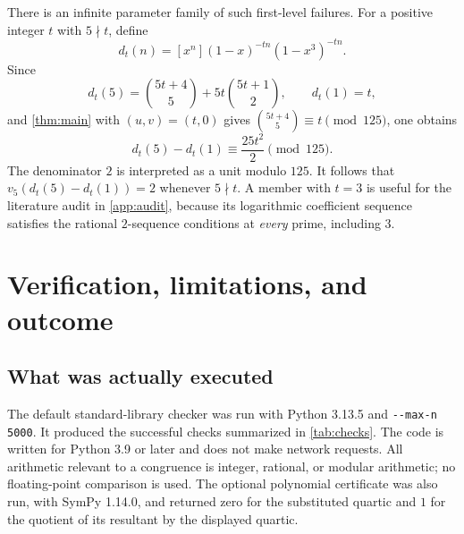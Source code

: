 \documentclass[11pt,a4paper]{article}
\numberwithin{equation}{section}
\theoremstyle{definition}
\theoremstyle{remark}
\begin{document}
There is an infinite parameter family of such first-level failures.
For a positive integer $t$ with $5\nmid t$, define
\[
 d_t(n)=[x^n](1-x)^{-tn}(1-x^3)^{-tn}.
\]
Since
\[
 d_t(5)=\binom{5t+4}{5}+5t\binom{5t+1}{2},\qquad d_t(1)=t,
\]
and \cref{thm:main} with $(u,v)=(t,0)$ gives
$\binom{5t+4}{5}\equiv t\pmod{125}$, one obtains
\begin{equation}\label{eq:period3-family}
 d_t(5)-d_t(1)\equiv\frac{25t^2}{2}\pmod{125}.
\end{equation}
The denominator $2$ is interpreted as a unit modulo $125$. It follows
that $v_5(d_t(5)-d_t(1))=2$ whenever $5\nmid t$.
A member with $t=3$ is useful for the literature audit in
\cref{app:audit}, because its logarithmic coefficient sequence satisfies
the rational $2$-sequence conditions at \emph{every} prime, including $3$.

\section{Verification, limitations, and outcome}\label{sec:verification}

\subsection{What was actually executed}

The default standard-library checker was run with Python 3.13.5 and
\lstinline|--max-n 5000|. It produced the successful checks summarized in
\cref{tab:checks}. The code is written for Python 3.9 or later and does
not make network requests. All arithmetic relevant to a congruence is
integer, rational, or modular arithmetic; no floating-point comparison
is used. The optional polynomial certificate was also run, with
SymPy 1.14.0, and returned zero for the substituted quartic and $1$ for
the quotient of its resultant by the displayed quartic.
\end{document}
